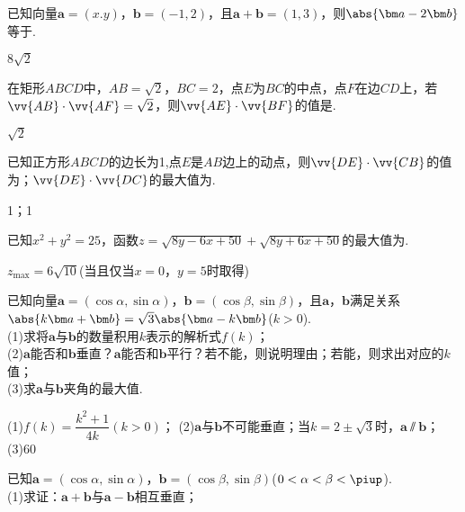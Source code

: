 \begin{Theorem}[平面向量基本定理]
\begin{exercise}
      已知向量$\bm a=(x.y)$，$\bm b=(-1,2)$，且$\bm a+\bm b=(1,3)$，则$\abs{\bm a-2\bm b}$等于\tk.
      \begin{answer}
        $8\sqrt{2}$
      \end{answer}
    \item%
      在矩形$ABCD$中，$AB=\sqrt{2}$，$BC=2$，点$E$为$BC$的中点，点$F$在边$CD$上，若$\vv{AB}\cdot\vv{AF}=\sqrt{2}$，则$\vv{AE}\cdot\vv{BF}$的值是\tk.
      \begin{answer}
        $\sqrt{2}$
      \end{answer}
    \item%
      已知正方形$ABCD$的边长为1,点$E$是$AB$边上的动点，则$\vv{DE}\cdot\vv{CB}$的值为\tk；$\vv{DE}\cdot\vv{DC}$的最大值为\tk.
      \begin{answer}
        1；1
      \end{answer}
    \item%
      已知$x^2+y^2=25$，函数$z=\sqrt{8y-6x+50}+\sqrt{8y+6x+50}$的最大值为\tk.
      \begin{answer}
        $z_{\max}=6\sqrt{10}$(当且仅当$x=0$，$y=5$时取得)
      \end{answer}
    \item%
      已知向量$\bm a=(\cos\alpha,\sin\alpha)$，$\bm b=(\cos\beta,\sin\beta)$，且$\bm a$，$\bm b$满足关系$\abs{k\bm a+\bm b}=\sqrt{3}\abs{\bm a-k\bm b}$($k>0$).\\
      (1)求将$\bm a$与$\bm b$的数量积用$k$表示的解析式$f(k)$；\\
      (2)\hspace{5pt}$\bm a$能否和$\bm b$垂直？$\bm a$能否和$\bm b$平行？若不能，则说明理由；若能，则求出对应的$k$值；\\
      (3)求$\bm a$与$\bm b$夹角的最大值.
      \begin{answer}
        (1)$f(k)=\dfrac{k^2+1}{4k} (k>0)$；
        (2)$\bm a$与$\bm b$不可能垂直；当$k=2\pm\sqrt{3}$时，$\bm a\varparallel \bm b$；
        (3)60\degree
      \end{answer}
    \vspace{7cm}
    \item%
      已知$\bm a=(\cos\alpha,\sin\alpha)$，$\bm b=(\cos\beta,\sin\beta)$($0<\alpha<\beta<\piup$).\\
      (1)求证：$\bm a+\bm b$与$\bm a-\bm b$相互垂直；\\

\end{exercise}
\end{Theorem}
